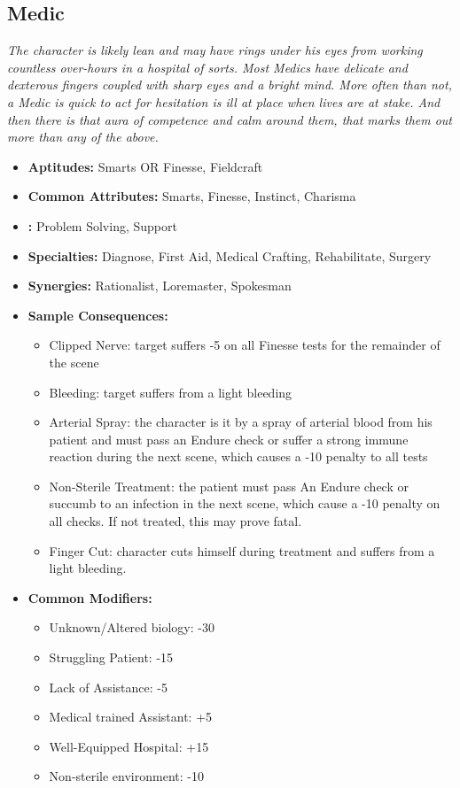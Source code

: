 \subsection{Medic}\label{Medic}
\textit{The character is likely lean and may have rings under his eyes from working countless over-hours in a hospital of sorts.
Most Medics have delicate and dexterous fingers coupled with sharp eyes and a bright mind.
More often than not, a Medic is quick to act for hesitation is ill at place when lives are at stake.
And then there is that aura of competence and calm around them, that marks them out more than any of the above.}
\begin{itemize}
	\item \textbf{Aptitudes:} Smarts OR Finesse, Fieldcraft
	\item \textbf{Common Attributes:} Smarts, Finesse, Instinct, Charisma
	\item \textbf{:} Problem Solving, Support
	\item \textbf{Specialties:} Diagnose, First Aid, Medical Crafting, Rehabilitate, Surgery
	\item \textbf{Synergies:} Rationalist, Loremaster, Spokesman
	\item \textbf{Sample Consequences:} 
	\begin{itemize}
		\item Clipped Nerve: target suffers -5 on all Finesse tests for the remainder of the scene
		\item Bleeding: target suffers from a light bleeding
		\item Arterial Spray: the character is it by a spray of arterial blood from his patient and must pass an Endure check or suffer a strong immune reaction during the next scene, which causes a -10 penalty to all tests
		\item Non-Sterile Treatment: the patient must pass An Endure check or succumb to an infection in the next scene, which cause a -10 penalty on all checks. If not treated, this may prove fatal.
		\item Finger Cut: character cuts himself during treatment and suffers from a light bleeding.
	\end{itemize}
	\item \textbf{Common Modifiers:}
	\begin{itemize}
		\item Unknown/Altered biology: -30
		\item Struggling Patient: -15
		\item Lack of Assistance: -5
		\item Medical trained Assistant: +5
		\item Well-Equipped Hospital: +15
		\item Non-sterile environment: -10
	\end{itemize}
\end{itemize}

